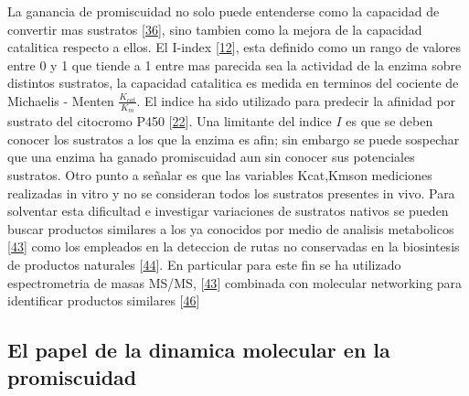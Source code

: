 \documentclass[12pt,twoside]{reedthesis}
\begin{document}
  La ganancia de promiscuidad no solo puede entenderse como la capacidad
  de convertir mas sustratos
  {[}\protect\hyperlink{ref-carbonell_molecular_2010}{36}{]}, sino tambien
  como la mejora de la capacidad catalitica respecto a ellos. El I-index
  {[}\protect\hyperlink{ref-nath_quantitative_2008}{12}{]}, esta definido
  como un rango de valores entre 0 y 1 que tiende a 1 entre mas parecida
  sea la actividad de la enzima sobre distintos sustratos, la capacidad
  catalitica es medida en terminos del cociente de Michaelis - Menten
  \(\frac{K_{cat}}{K_m}\). El indice ha sido utilizado para predecir la
  afinidad por sustrato del citocromo P450
  {[}\protect\hyperlink{ref-nath_quantifying_2010}{22}{]}. Una limitante
  del indice \(I\) es que se deben conocer los sustratos a los que la
  enzima es afin; sin embargo se puede sospechar que una enzima ha ganado
  promiscuidad aun sin conocer sus potenciales sustratos. Otro punto a
  señalar es que las variables Kcat,Kmson mediciones realizadas in vitro y
  no se consideran todos los sustratos presentes in vivo. Para solventar
  esta dificultad e investigar variaciones de sustratos nativos se pueden
  buscar productos similares a los ya conocidos por medio de analisis
  metabolicos {[}\protect\hyperlink{ref-nesvizhskii_analysis_2007}{43}{]}
  como los empleados en la deteccion de rutas no conservadas en la
  biosintesis de productos naturales
  {[}\protect\hyperlink{ref-medema_computational_2015}{44}{]}. En
  particular para este fin se ha utilizado espectrometria de masas MS/MS,
  {[}\protect\hyperlink{ref-nesvizhskii_analysis_2007}{43}{]} combinada
  con molecular networking para identificar productos similares
  {[}\protect\hyperlink{ref-yang_molecular_2013}{46}{]}
  
  \subsection{El papel de la dinamica molecular en la
  promiscuidad}\label{el-papel-de-la-dinamica-molecular-en-la-promiscuidad}
  
\end{document}
